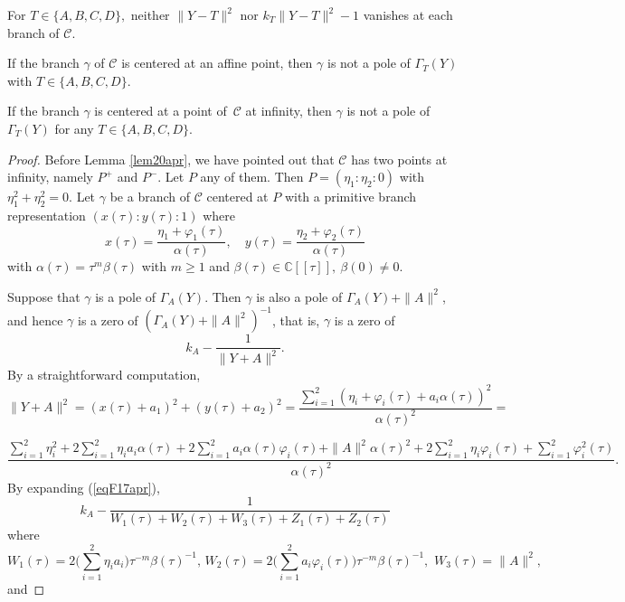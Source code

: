 \documentclass[10pt,a4paper]{amsart}
\def\cC{\mathcal C}
\begin{document}
\begin{lem}
\label{lem20apr} For $T\in\{A,B,C,D\},$ neither $\|Y-T\|^2$ nor $k_T\|Y-T\|^2-1$ vanishes at each branch of $\cC.$
\end{lem}

\begin{lem}
\label{lem17apr} If the branch $\gamma$ of $\cC$ is centered at an affine point, then $\gamma$ is not a pole of $\Gamma_T(Y)$ with $T\in \{A,B,C,D\}$.
\end{lem}

\begin{lem}
\label{lemH071224} If the branch $\gamma$ is centered at a point of\, $\cC$ at infinity, then $\gamma$ is not a pole of $\Gamma_T(Y)$ for any $T\in \{A,B,C,D\}$.
\end{lem}

\begin{proof} Before Lemma \ref{lem20apr}, we have pointed out that $\cC$ has two points at infinity, namely $P^+$ and $P^-$. Let $P$ any of them. Then $P=(\eta_1:\eta_2:0)$ with $\eta_1^2+\eta_2^2=0$. Let $\gamma$ be a branch of $\cC$ centered at $P$ with a primitive branch representation
$(x(\tau):y(\tau):1)$ where
$$x(\tau)=\frac{\eta_1+\varphi_1(\tau)}{\alpha(\tau)},\quad y(\tau)=\frac{\eta_2+\varphi_2(\tau)}{\alpha(\tau)}$$
with $\alpha(\tau)=\tau^{m} \beta(\tau)$ with $m\ge 1$ and $\beta(\tau)\in \mathbb{C}[[\tau]],\  \beta(0)\neq 0$.

Suppose that  $\gamma$ is a pole of $\Gamma_A(Y)$.  Then $\gamma$ is also a pole of $\Gamma_A(Y)+\|A\|^2$, and hence $\gamma$ is a zero of $(\Gamma_A(Y)+\|A\|^2)^{-1}$, that is, $\gamma$ is a zero of
\begin{equation}
\label{eqF17apr}
k_A-\frac{1}{\|Y+A\|^2}.
\end{equation}
 By a straightforward computation,
$$
\|Y+A\|^2=(x(\tau)+a_1)^2+(y(\tau)+a_2)^2=
\frac{\sum\limits_{i=1}^2(\eta_i+\varphi_i(\tau)+a_i\alpha(\tau))^2}{\alpha(\tau)^2}=
$$



$$\frac{\sum\limits_{i=1}^2 \eta_i^2+2\sum\limits_{i=1}^2 \eta_ia_i\alpha(\tau)+2\sum\limits_{i=1}^2 a_i\alpha(\tau)\varphi_i(\tau)+\|A\|^2\alpha(\tau)^2+2\sum\limits_{i=1}^2 \eta_i\varphi_i(\tau)
+\sum\limits_{i=1}^2 \varphi_i^2(\tau)}{\alpha(\tau)^2}.
$$
By expanding (\ref{eqF17apr}),
$$k_A- \frac{ 1}{W_1(\tau)+W_2(\tau)+W_3(\tau)+Z_1(\tau)+Z_2(\tau)}$$
where
$$
W_1(\tau)=2\Big(\sum\limits_{i=1}^2 \eta_ia_i\Big)\tau^{-m}\beta(\tau)^{-1},\,
W_2(\tau)=2\Big(\sum\limits_{i=1}^2 a_i\varphi_i(\tau)\Big)\tau^{-m}\beta(\tau)^{-1},\,\,
W_3(\tau)=\|A\|^2,
$$
and


\end{proof}
\end{document}
